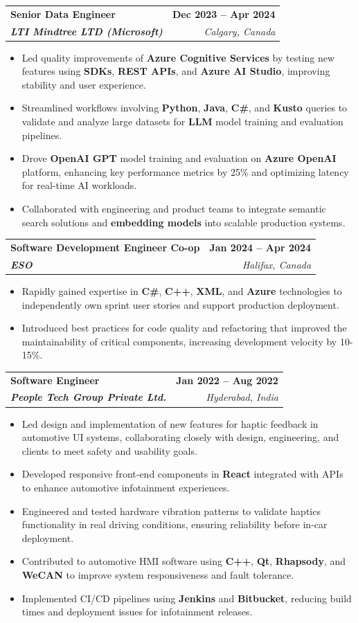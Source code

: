 \documentclass[letterpaper,11pt]{article}
\makeatletter
\newcommand{\resumeItem}[1]{
  \item\small{
    {#1 \vspace{-2pt}}
  }
}
\newcommand{\resumeSubheading}[4]{
  \vspace{-2pt}\item
    \begin{tabular*}{1.0\textwidth}[t]{l@{\extracolsep{\fill}}r}
      \textbf{#1} & \textbf{\small #2} \\
      \textit{\small#3} & \textit{\small #4} \\
    \end{tabular*}\vspace{-7pt}
}
\newcommand{\resumeItemListStart}{\begin{itemize}}
\newcommand{\resumeItemListEnd}{\end{itemize}\vspace{-5pt}}
\makeatother
\begin{document}
    \resumeSubheading
      {Senior Data Engineer}{\textbf{Dec 2023 -- Apr 2024}}
      {\textbf{LTI Mindtree LTD (Microsoft)}}{Calgary, Canada}
      \resumeItemListStart
        \resumeItem{Led quality improvements of \textbf{Azure Cognitive Services} by testing new features using \textbf{SDKs}, \textbf{REST APIs}, and \textbf{Azure AI Studio}, improving stability and user experience.}
        \resumeItem{Streamlined workflows involving \textbf{Python}, \textbf{Java}, \textbf{C\#}, and \textbf{Kusto} queries to validate and analyze large datasets for \textbf{LLM} model training and evaluation pipelines.}
        \resumeItem{Drove \textbf{OpenAI GPT} model training and evaluation on \textbf{Azure OpenAI} platform, enhancing key performance metrics by 25\% and optimizing latency for real-time AI workloads.}
        \resumeItem{Collaborated with engineering and product teams to integrate semantic search solutions and \textbf{embedding models} into scalable production systems.}
      \resumeItemListEnd
    
    \resumeSubheading
      {Software Development Engineer Co-op}{\textbf{Jan 2024 -- Apr 2024}}
      {\textbf{ESO}}{Halifax, Canada}
      \resumeItemListStart
        \resumeItem{Rapidly gained expertise in \textbf{C\#}, \textbf{C++}, \textbf{XML}, and \textbf{Azure} technologies to independently own sprint user stories and support production deployment.}
        \resumeItem{Introduced best practices for code quality and refactoring that improved the maintainability of critical components, increasing development velocity by 10-15\%.}
      \resumeItemListEnd

    \resumeSubheading
      {Software Engineer}{\textbf{Jan 2022 -- Aug 2022}}
      {\textbf{People Tech Group Private Ltd.}}{Hyderabad, India}
      \resumeItemListStart
        \resumeItem{Led design and implementation of new features for haptic feedback in automotive UI systems, collaborating closely with design, engineering, and clients to meet safety and usability goals.}
        \resumeItem{Developed responsive front-end components in \textbf{React} integrated with APIs to enhance automotive infotainment experiences.}
        \resumeItem{Engineered and tested hardware vibration patterns to validate haptics functionality in real driving conditions, ensuring reliability before in-car deployment.}
        \resumeItem{Contributed to automotive HMI software using \textbf{C++}, \textbf{Qt}, \textbf{Rhapsody}, and \textbf{WeCAN} to improve system responsiveness and fault tolerance.}
        \resumeItem{Implemented CI/CD pipelines using \textbf{Jenkins} and \textbf{Bitbucket}, reducing build times and deployment issues for infotainment releases.}
      \resumeItemListEnd
\end{document}
